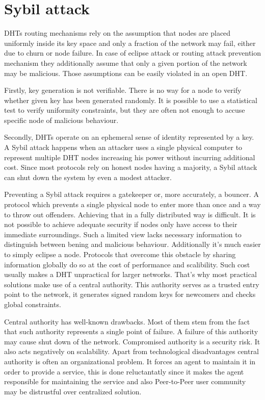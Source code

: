 \section{Sybil attack}
  DHTs routing mechanisms rely on the assumption that nodes are placed uniformly
  inside its key space and only a fraction of the network may fail, either due
  to churn or node failure. In case of eclipse attack or routing attack
  prevention mechanism they additionally assume that only a given portion of the
  network may be malicious. Those assumptions can be easily violated in an open
  DHT.

  Firstly, key generation is not verifiable. There is no way for a node to
  verify whether given key has been generated randomly. It is possible to use a
  statistical test to verify uniformity constraints, but they are often not
  enough to accuse specific node of malicious behaviour.

  Secondly, DHTs operate on an ephemeral sense of identity represented by a key.
  A Sybil attack happens when an attacker uses a single physical computer to
  represent multiple DHT nodes increasing his power without incurring additional
  cost. Since most protocols rely on honest nodes having a majority, a Sybil
  attack can shut down the system by even a modest attacker.

  Preventing a Sybil attack requires a gatekeeper or, more accurately, a
  bouncer. A protocol which prevents a single physical node to enter more than
  once and a way to throw out offenders. Achieving that in a fully distributed
  way is difficult. It is not possible to achieve adequate security if nodes
  only have access to their immediate surroundings. Such a limited view lacks
  necessary information to distinguish between bening and malicious behaviour.
  Additionally it's much easier to simply eclipse a node. Protocols that
  overcome this obstacle by sharing information globally do so at the cost of
  performance and scalibility. Such cost usually makes a DHT unpractical for
  larger networks. That's why most practical solutions make use of a central
  authority. This authority serves as a trusted entry point to the network, it
  generates signed random keys for newcomers and checks global constraints.

  Central authority has well-known drawbacks. Most of them stem from the fact
  that such authority represents a single point of failure. A failure of this
  authority may cause shut down of the network. Compromised authority is a
  security risk. It also acts negatively on scalability. Apart from
  technological disadvantages central authority is often an organizational
  problem. It forces an agent to maintain it in order to provide a service, this
  is done reluctantatly since it makes the agent responsible for maintaining the
  service and also Peer-to-Peer user community may be distrustful over
  centralized solution.

